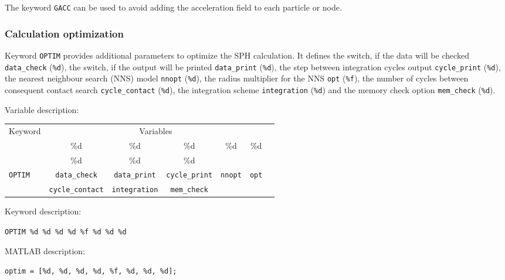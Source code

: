 The keyword \texttt{GACC} can be used to avoid adding the acceleration field to each particle or node.

\newpage


\subsubsection{Calculation optimization}

Keyword \texttt{OPTIM} provides additional parameters to optimize the SPH calculation. It defines the switch, if the data will be checked \texttt{data\_check} (\texttt{\%d}), the switch, if the output will be printed \texttt{data\_print} (\texttt{\%d}), the step between integration cycles output \texttt{cycle\_print} (\texttt{\%d}), the nearest neighbour search (NNS) model \texttt{nnopt} (\texttt{\%d}), the radius multiplier for the NNS \texttt{opt} (\texttt{\%f}), the number of cycles between consequent contact search \texttt{cycle\_contact} (\texttt{\%d}), the integration scheme \texttt{integration} (\texttt{\%d}) and the memory check option \texttt{mem\_check} (\texttt{\%d}).

Variable description:

\begin{tabular}{|l|c|c|c|c|c|c|}
\hline
\multirow{3}{*}{Keyword} & \multicolumn{5}{c|}{Variables} \\ \cline{2-6}
& \%d & \%d & \%d & \%d & \%d \\ \cline{2-6}
& \%d & \%d & \%d \\  \hline
\multirow{2}{*}{\texttt{OPTIM}} & \texttt{data\_check} & \texttt{data\_print} & \texttt{cycle\_print} & \texttt{nnopt} & \texttt{opt} \\ \cline{2-6}
& \texttt{cycle\_contact} & \texttt{integration} & \texttt{mem\_check} \\ \cline{1-4}
\end{tabular}

Keyword description:

\begin{tcolorbox}
\texttt{OPTIM \%d \%d \%d \%d \%f \%d \%d \%d}
\end{tcolorbox}

MATLAB description:

\begin{tcolorbox}
\texttt{optim = [\%d, \%d, \%d, \%d, \%f, \%d, \%d, \%d];}
\end{tcolorbox}


